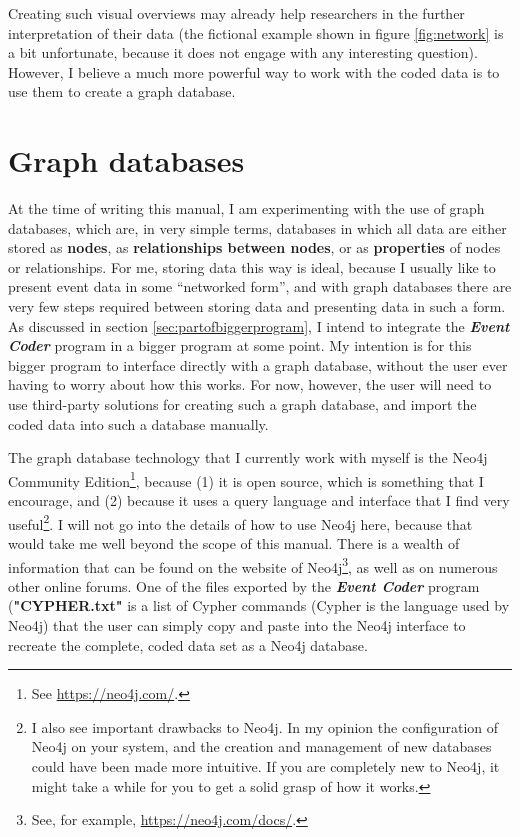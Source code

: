\documentclass{memoir}
\begin{document}
Creating such visual overviews may already help researchers in the further interpretation of their data (the fictional example shown in figure \ref{fig:network} is a bit unfortunate, because it does not engage with any interesting question). However, I believe a much more powerful way to work with the coded data is to use them to create a graph database. 

\section{Graph databases}
\label{sec:graphdatabases}

At the time of writing this manual, I am experimenting with the use of graph databases, which are, in very simple terms, databases in which all data are either stored as \textbf{nodes}, as \textbf{relationships between nodes}, or as \textbf{properties} of nodes or relationships. For me, storing data this way is ideal, because I usually like to present event data in some ``networked form'', and with graph databases there are very few steps required between storing data and presenting data in such a form. As discussed in section \ref{sec:partofbiggerprogram}, I intend to integrate the \textbf{\emph{Event Coder}} program in a bigger program at some point. My intention is for this bigger program to interface directly with a graph database, without the user ever having to worry about how this works. For now, however, the user will need to use third-party solutions for creating such a graph database, and import the coded data into such a database manually.

The graph database technology that I currently work with myself is the Neo4j Community Edition\footnote{See \url{https://neo4j.com/}.}, because (1) it is open source, which is something that I encourage, and (2) because it uses a query language and interface that I find very useful\footnote{I also see important drawbacks to Neo4j. In my opinion the configuration of Neo4j on your system, and the creation and management of new databases could have been made more intuitive. If you are completely new to Neo4j, it might take a while for you to get a solid grasp of how it works.}. I will not go into the details of how to use Neo4j here, because that would take me well beyond the scope of this manual. There is a wealth of information that can be found on the website of Neo4j\footnote{See, for example, \url{https://neo4j.com/docs/}.}, as well as on numerous other online forums. One of the files exported by the \emph{\textbf{Event Coder}} program (\textbf{"CYPHER.txt"} is a list of Cypher commands (Cypher is the language used by Neo4j) that the user can simply copy and paste into the Neo4j interface to recreate the complete, coded data set as a Neo4j database.    
\end{document}
